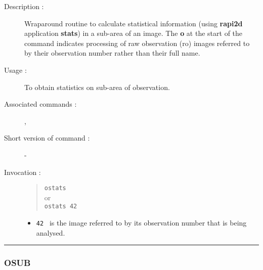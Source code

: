 \begin{description}

\item[Description :] Wraparound routine to calculate statistical
information (using {\bf rapi2d} application {\bf stats}) in a sub-area of an
image. The {\bf o} at the start of the command indicates processing of raw
observation ({\sc ro}) images referred to by their observation number
rather than their full name.

\item[Usage :] To obtain statistics on sub-area of observation.
\item[Associated commands :] {\tt {}}, 
{\tt {}}
\item[Short version of command :] -
\item[Invocation :]

\begin{quote}{\tt  ostats }\\
or \\
{\tt ostats 42 }
\end{quote}

\begin{itemize}

\item {\tt 42 } is the image referred to by its observation number that
  is being analysed.
\end{itemize}

\end{description}

\hrule 
\subsubsection*{\label{OSUB}OSUB}

